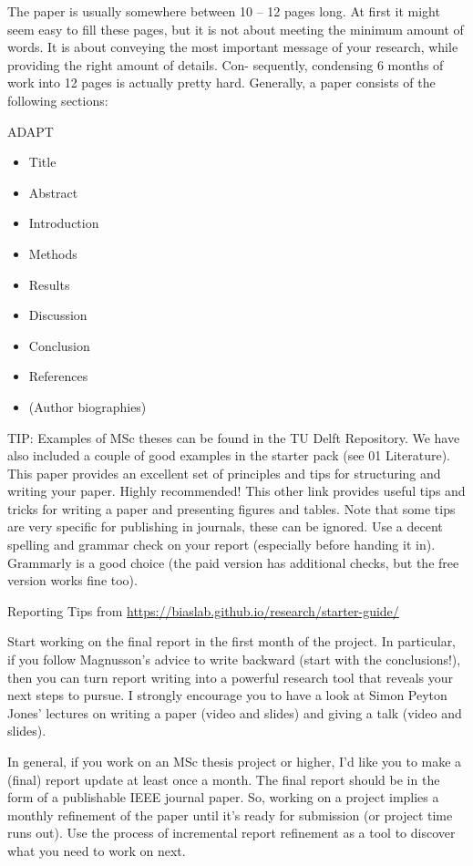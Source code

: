 The paper is usually somewhere between 10 – 12 pages long. At first it might seem easy to fill these pages, but it is not about meeting the minimum amount of words. It is about conveying the most important message of your research, while providing the right amount of details. Con- sequently, condensing 6 months of work into 12 pages is actually pretty hard. Generally, a paper consists of the following sections:

ADAPT

\begin{itemize}
    \item Title
    \item Abstract
    \item Introduction
    \item Methods
    \item Results
    \item Discussion
    \item Conclusion
    \item References
    \item (Author biographies)
\end{itemize}

 TIP: 
Examples of MSc theses can be found in the TU Delft Repository. We have also included a couple of good examples in the starter pack (see 01 Literature).
This paper provides an excellent set of principles and tips for structuring and writing your paper. Highly recommended!
This other link provides useful tips and tricks for writing a paper and presenting figures and tables. Note that some tips are very specific for publishing in journals, these can be ignored.
Use a decent spelling and grammar check on your report (especially before handing it in). Grammarly is a good choice (the paid version has additional checks, but the free version works fine too).


Reporting Tips from \href{https://biaslab.github.io/research/starter-guide/}{https://biaslab.github.io/research/starter-guide/}

Start working on the final report in the first month of the project. In particular, if you follow Magnusson’s advice to write backward (start with the conclusions!), then you can turn report writing into a powerful research tool that reveals your next steps to pursue. I strongly encourage you to have a look at Simon Peyton Jones’ lectures on writing a paper (video and slides) and giving a talk (video and slides).

In general, if you work on an MSc thesis project or higher, I’d like you to make a (final) report update at least once a month. The final report should be in the form of a publishable IEEE journal paper. So, working on a project implies a monthly refinement of the paper until it’s ready for submission (or project time runs out). Use the process of incremental report refinement as a tool to discover what you need to work on next.


